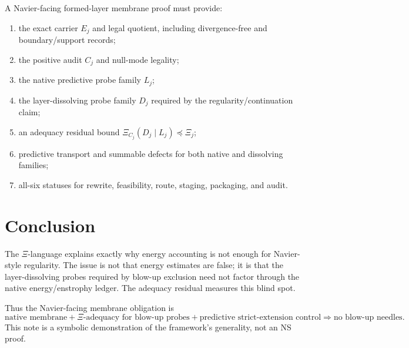 \documentclass[11pt]{article}
\begin{document}
A Navier-facing formed-layer membrane proof must provide:
\begin{enumerate}[label=(O\arabic*)]
\item the exact carrier $E_j$ and legal quotient, including divergence-free and boundary/support records;
\item the positive audit $C_j$ and null-mode legality;
\item the native predictive probe family $L_j$;
\item the layer-dissolving probe family $D_j$ required by the regularity/continuation claim;
\item an adequacy residual bound $\Xi_{C_j}(D_j\mid L_j)\preceq\Xi_j$;
\item predictive transport and summable defects for both native and dissolving families;
\item all-six statuses for rewrite, feasibility, route, staging, packaging, and audit.
\end{enumerate}

\section{Conclusion}

The $\Xi$-language explains exactly why energy accounting is not enough for Navier-style regularity.  The issue is not that energy estimates are false; it is that the layer-dissolving probes required by blow-up exclusion need not factor through the native energy/enstrophy ledger.  The adequacy residual measures this blind spot.

Thus the Navier-facing membrane obligation is
\[
\boxed{
\text{native membrane}
+
\Xi\text{-adequacy for blow-up probes}
+
\text{predictive strict-extension control}
\Rightarrow
\text{no blow-up needles}.
}
\]
This note is a symbolic demonstration of the framework's generality, not an NS proof.
\end{document}
